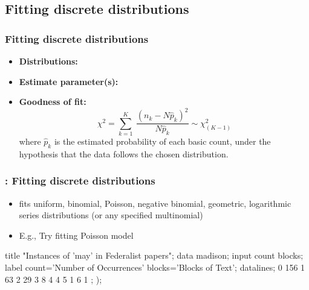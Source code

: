 \subsection{Fitting discrete distributions} 
\begin{frame}
\frametitle{Fitting discrete distributions}
  \begin{itemize}
   \item {\large\bfseries Distributions:}
  \item {\large\bfseries Estimate parameter(s):}
  \item {\large\bfseries Goodness of fit:}
  \[
  \chi^2 = \sum_{k=1}^K \:
  \frac{{ ( n_k - N \hat{p}_k ) }^2}
  { N \hat{p}_k }  \sim \chi^2_{( K-1 )}
  \]
where \(\hat{p}_k\) is the estimated probability of each basic count,
under the hypothesis that the data follows the chosen distribution.
  \end{itemize}
\end{frame}

\begin{frame}[fragile]

\frametitle{: Fitting discrete distributions}
  \begin{itemize}
  \item {} fits uniform, binomial,
   Poisson, negative binomial, geometric,  logarithmic series
   distributions (or any specified multinomial)
  \item E.g., Try fitting Poisson model
\end{itemize}

\vspace{1.5ex}
\begin{Input}[fontsize=\small,label=\fbox{\texttt{madfit.sas}},baselinestretch=0.8]
title "Instances of 'may' in Federalist papers";
data madison;
   input count blocks;
   label count='Number of Occurrences'
         blocks='Blocks of Text';
datalines;
  0    156
  1     63
  2     29
  3      8
  4      4
  5      1
  6      1
;
      );
\end{Input}

\end{frame}

